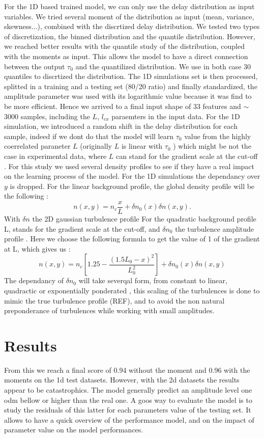 \documentclass[11pt,a4paper,openany]{report}
\begin{document}
\begin{multicols}{2}
    For the 1D based trained model, we can only use the delay distribution as input variables. We tried several moment of the distribution as input (mean, variance, skewness...), combined with the discrtized delay distribution. We tested two types of discretization, the binned distribution and the quantile distribution. However, we reached better results with the quantile study of the distribution, coupled with the moments as input. This allows the model to have a direct connection between the output $\tau_0$ and the quantilized distribution. We use in both case 30 quantiles to discrtized the distribution. The 1D simulations set is then processed, splitted in a training and a testing set (80/20 ratio) and finally standardized, the amplitude parameter was used with its logarithmic value because it was find to be more efficient. Hence we arrived to a final input shape of 33 features and $\sim$ 3000 samples, including the $L$, $l_{cx}$ paraemters in the input data. For the 1D simulation, we introduced a random shift in the delay distribution for each sample, indeed if we dont do that the model will learn $\tau_0$ value from the highly coerrelated paraneter $L$ (originally $L$ is linear with $\tau_0$  ) which might be not the case in experimental data, where $L$ can stand for the gradient scale at the cut-off \cite{Krutkin_thesis}. For this study we used several density profiles to see if they have a real impact on the learning process of the model. For the 1D simulations the dependancy over $y$ is dropped.
    For the linear background profile, the global density profile will be the following :
    $$n(x,y) = n_c \frac{x}{L} + \delta n_0(x) \delta n(x,y).$$ With $\delta n $ the 2D gaussian turbulence profile
    For the quadratic background profile L, stands for the gradient scale at the cut-off, and $\delta n_0$ the turbulence amplitude profile . Here we choose the following formula to get the value of 1 of the gradient at L, which gives us :
    $$n(x,y) = n_c \left[1.25 - \frac{(1.5L_0 - x)^2}{L_0^2} \right] + \delta n_0(x)\delta n (x,y)$$
    The dependancy of $\delta n_0$ will take severqal form, from constant to linear, quadractic or exponentially ponderated \cite{SPR_Krutkin}, this scaling of the turbulences is done to mimic the true turbulence profile (REF), and to avoid the non natural preponderance of turbulences while working with small amplitudes.

    \section{Results}
    From this we reach a final score of 0.94 without the moment and 0.96 with the moments on the 1d test datasets. However, with  the 2d datasets the results appear to be catastrophics. The model generally predict an amplitude level one odm bellow or higher than the real one. A goos way to evaluate the model is to study the residuals of this latter for each parameters value of the testing set. It allows to have a quick overview of the performance model, and on the impact of parameter value on the model performances.


\end{multicols}
\end{document}
